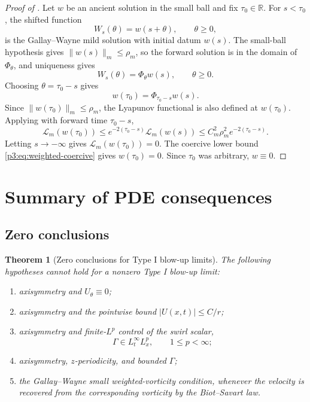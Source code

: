 \documentclass[11pt]{amsart}
\theoremstyle{plain}
\newtheorem{theorem}{Theorem}[section]
\theoremstyle{definition}
\theoremstyle{remark}
\numberwithin{equation}{section}
\begin{document}
\begin{proof}[Proof of ]
Let \(w\) be an ancient solution in the small ball and fix
\(\tau_0\in\mathbb R\).  For \(s<\tau_0\), the shifted function
\[
   W_s(\theta)=w(s+\theta),\qquad \theta\ge0,
\]
is the Gallay--Wayne mild solution with initial datum \(w(s)\).  The small-ball
hypothesis gives \(\|w(s)\|_m\le\rho_m\), so the forward solution is in the
domain of \(\Phi_\theta\), and uniqueness gives
\[
   W_s(\theta)=\Phi_\theta w(s),\qquad \theta\ge0.
\]
Choosing \(\theta=\tau_0-s\) gives
\[
   w(\tau_0)=\Phi_{\tau_0-s}w(s).
\]
Since \(\|w(\tau_0)\|_m\le\rho_m\), the Lyapunov functional is also defined at
\(w(\tau_0)\).  Applying  with forward time
\(\tau_0-s\),
\[
   \mathcal L_m(w(\tau_0))
   \le
   e^{-2(\tau_0-s)}\mathcal L_m(w(s))
   \le
   C_m^2\rho_m^2e^{-2(\tau_0-s)} .
\]
Letting \(s\to-\infty\) gives \(\mathcal L_m(w(\tau_0))=0\).  The coercive
lower bound \eqref{p3:eq:weighted-coercive} gives \(w(\tau_0)=0\).  Since
\(\tau_0\) was arbitrary, \(w\equiv0\).
\end{proof}

\section{Summary of PDE consequences}
\label{p3:sec:summary}

\subsection{Zero conclusions}

\begin{theorem}[Zero conclusions for Type I blow-up limits]
\label{p3:thm:typeI-zero-hypotheses}
The following hypotheses cannot hold for a nonzero Type I blow-up limit:
\begin{enumerate}[label=\textup{(\roman*)}]
\item axisymmetry and \(U_\theta\equiv0\);
\item axisymmetry and the pointwise bound \(|U(x,t)|\le C/r\);
\item axisymmetry and finite-\(L^p\) control of the swirl scalar,
\[
   \Gamma\in L_t^\infty L_x^p,\qquad 1\le p<\infty;
\]
\item axisymmetry, \(z\)-periodicity, and bounded \(\Gamma\);
\item the Gallay--Wayne small weighted-vorticity condition, whenever the
velocity is recovered from the corresponding vorticity by the Biot--Savart law.
\end{enumerate}
\end{theorem}
\end{document}
